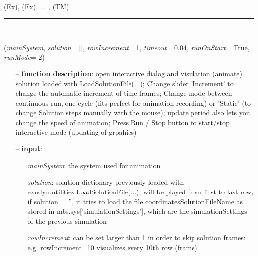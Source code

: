 \begin{itemize}[leftmargin=1.4cm]
\begin{itemize}[leftmargin=0.5cm]
\begin{itemize}[leftmargin=1.4cm]
\begin{itemize}[leftmargin=1.4cm]
\begin{itemize}[leftmargin=0.5cm]
\begin{itemize}[leftmargin=1.4cm]
\begin{itemize}[leftmargin=0.5cm]
\begin{itemize}[leftmargin=1.4cm]
\begin{itemize}[leftmargin=1.4cm]
\\  (Ex), 
 (Ex), 
 ...
, 
 (TM)\ei

%
\noindent\rule{8cm}{0.75pt}\vspace{1pt} \\ 
\begin{flushleft}
\label{sec:interactive:SolutionViewer}
({\it mainSystem}, {\it solution}= [], {\it rowIncrement}= 1, {\it timeout}= 0.04, {\it runOnStart}= True, {\it runMode}= 2)
\end{flushleft}
\setlength{\itemindent}{0.7cm}
\begin{itemize}[leftmargin=0.7cm]
  \item[--]  {\bf function description}: open interactive dialog and visulation (animate) solution loaded with LoadSolutionFile(...); Change slider 'Increment' to change the automatic increment of time frames; Change mode between continuous run, one cycle (fits perfect for animation recording) or 'Static' (to change Solution steps manually with the mouse); update period also lets you change the speed of animation; Press Run / Stop button to start/stop interactive mode (updating of grpahics)  \item[--]  {\bf input}: \vspace{-6pt}
  \begin{itemize}[leftmargin=1.2cm]
\setlength{\itemindent}{-0.7cm}
    \item[] {\it mainSystem}: the system used for animation
    \item[] {\it   solution}: solution dictionary previously loaded with exudyn.utilities.LoadSolutionFile(...); will be played from first to last row; if solution=='', it tries to load the file coordinatesSolutionFileName as stored in mbs.sys['simulationSettings'], which are the simulationSettings of the previous simulation
    \item[] {\it   rowIncrement}: can be set larger than 1 in order to skip solution frames: e.g. rowIncrement=10 visualizes every 10th row (frame)

\end{itemize}
\end{itemize}
\end{itemize}
\end{itemize}
\end{itemize}
\end{itemize}
\end{itemize}
\end{itemize}
\end{itemize}
\end{itemize}
\end{itemize}
